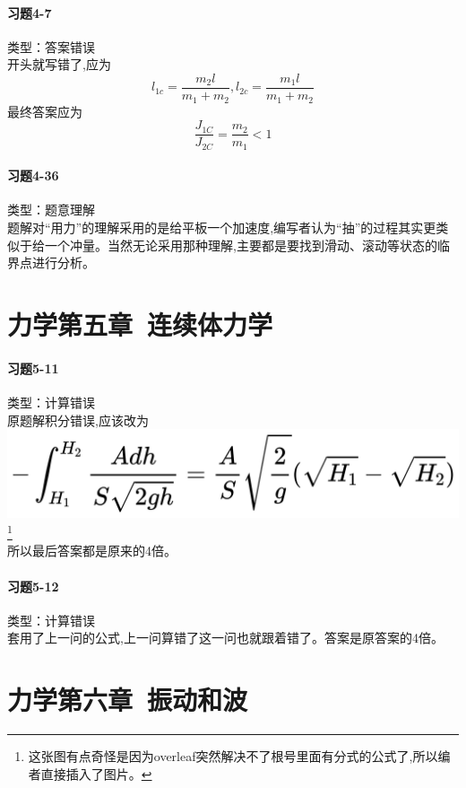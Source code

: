 \documentclass[a4paper,11pt]{ctexart}
\begin{document}
\paragraph{习题4-7}类型：答案错误\\
开头就写错了,应为
\begin{equation*}
    l_{1c}=\frac{m_2l}{m_1+m_2},l_{2c}=\frac{m_1l}{m_1+m_2}
\end{equation*}
最终答案应为
\begin{equation*}
    \frac{J_{1C}}{J_{2C}} =\frac{m_2}{m_1}<1
\end{equation*}

\paragraph{习题4-36}类型：题意理解\\
题解对“用力”的理解采用的是给平板一个加速度,编写者认为“抽”的过程其实更类似于给一个冲量。当然无论采用那种理解,主要都是要找到滑动、滚动等状态的临界点进行分析。

\section{力学第五章\ 连续体力学}
\paragraph{习题5-11}类型：计算错误\\
原题解积分错误,应该改为\\
\includegraphics[scale = 0.045]{1.jpg}\footnote{这张图有点奇怪是因为overleaf突然解决不了根号里面有分式的公式了,所以编者直接插入了图片。}\\
所以最后答案都是原来的4倍。

\paragraph{习题5-12}类型：计算错误\\
套用了上一问的公式,上一问算错了这一问也就跟着错了。答案是原答案的4倍。

\section{力学第六章\ 振动和波}
\end{document}
